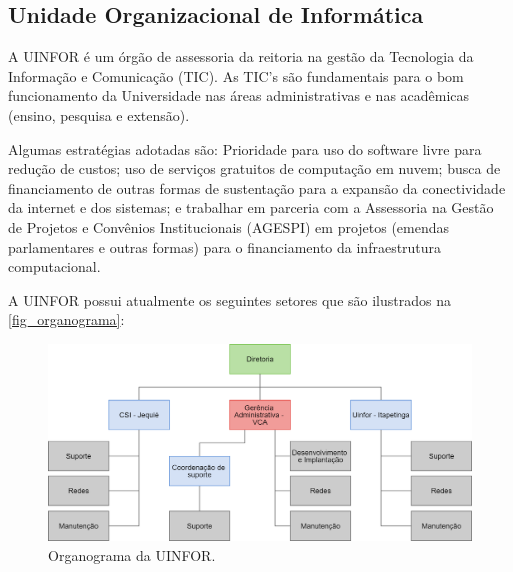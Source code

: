 \subsection{Unidade Organizacional de Informática}

A UINFOR é um órgão de assessoria da reitoria na gestão da Tecnologia da Informação e Comunicação (TIC). As TIC's são fundamentais para o bom funcionamento da Universidade nas áreas administrativas e nas acadêmicas (ensino, pesquisa e extensão). 

Algumas estratégias adotadas são: Prioridade para uso do software livre para redução de custos; uso de serviços gratuitos de computação em nuvem; busca de financiamento de outras formas de sustentação para a expansão da conectividade da internet e dos sistemas; e trabalhar em parceria com a Assessoria na Gestão de Projetos e Convênios Institucionais (AGESPI) em projetos (emendas parlamentares e outras formas) para o financiamento da infraestrutura computacional.

A UINFOR possui atualmente os seguintes setores que são ilustrados na \autoref{fig_organograma}:

\begin{figure}[htb]
    \caption{\label{fig_organograma}Organograma da UINFOR.}
    \begin{center}
        \includegraphics[scale=0.32]{imagens/organograma.png}
    \end{center}
\end{figure}

